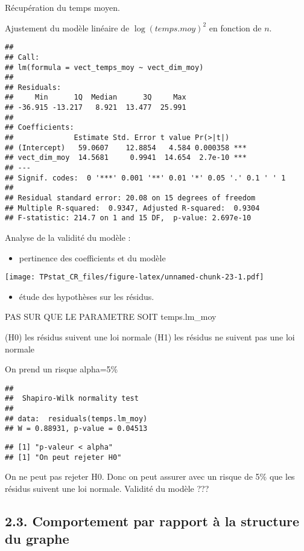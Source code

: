 \documentclass[]{article}
\providecommand{\tightlist}{%
  \setlength{\itemsep}{0pt}\setlength{\parskip}{0pt}}
\begin{document}
Récupération du temps moyen.

Ajustement du modèle linéaire de \(\log(temps.moy)^2\) en fonction de
\(n\).

\begin{verbatim}
## 
## Call:
## lm(formula = vect_temps_moy ~ vect_dim_moy)
## 
## Residuals:
##     Min      1Q  Median      3Q     Max 
## -36.915 -13.217   8.921  13.477  25.991 
## 
## Coefficients:
##              Estimate Std. Error t value Pr(>|t|)    
## (Intercept)   59.0607    12.8854   4.584 0.000358 ***
## vect_dim_moy  14.5681     0.9941  14.654  2.7e-10 ***
## ---
## Signif. codes:  0 '***' 0.001 '**' 0.01 '*' 0.05 '.' 0.1 ' ' 1
## 
## Residual standard error: 20.08 on 15 degrees of freedom
## Multiple R-squared:  0.9347, Adjusted R-squared:  0.9304 
## F-statistic: 214.7 on 1 and 15 DF,  p-value: 2.697e-10
\end{verbatim}

Analyse de la validité du modèle :

\begin{itemize}
\tightlist
\item
  pertinence des coefficients et du modèle
\end{itemize}

\texttt{[image: TPstat\_CR\_files/figure-latex/unnamed-chunk-23-1.pdf]}

\begin{itemize}
\tightlist
\item
  étude des hypothèses sur les résidus.
\end{itemize}

PAS SUR QUE LE PARAMETRE SOIT temps.lm\_moy

(H0) les résidus suivent une loi normale (H1) les résidus ne suivent pas
une loi normale

On prend un risque alpha=5\%

\begin{verbatim}
## 
##  Shapiro-Wilk normality test
## 
## data:  residuals(temps.lm_moy)
## W = 0.88931, p-value = 0.04513
\end{verbatim}

\begin{verbatim}
## [1] "p-valeur < alpha"
## [1] "On peut rejeter H0"
\end{verbatim}

On ne peut pas rejeter H0. Donc on peut assurer avec un risque de 5\%
que les résidus suivent une loi normale. Validité du modèle ???

\hypertarget{comportement-par-rapport-uxe0-la-structure-du-graphe}{%
\subsection{2.3. Comportement par rapport à la structure du
graphe}\label{comportement-par-rapport-uxe0-la-structure-du-graphe}}
\end{document}
